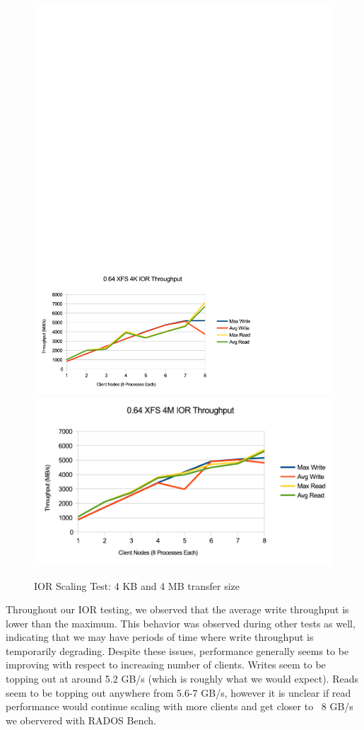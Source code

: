 \documentclass{article}
\begin{document}
\begin{figure}[htb]
\centering
\includegraphics[width=5in]{ior-064-4k}
\includegraphics[width=5in]{ior-064-4m}
\caption{IOR Scaling Test: 4 KB and 4 MB transfer size}
\label{fig:ior-064}
\end{figure}

Throughout our IOR testing, we observed that the average write throughput is 
lower than the maximum.  This behavior was observed during other tests as well,
indicating that we may have periods of time where write throughput is
temporarily degrading.  Despite these issues, performance generally seems to be
improving with respect to increasing number of clients.  Writes seem to be topping out at
around 5.2 GB/s (which is roughly what we would expect).  Reads seem to be
topping out anywhere from 5.6-7 GB/s, however it is unclear if read performance
would continue scaling with more clients and get closer to ~8 GB/s  we
obervered with RADOS Bench.
\end{document}
